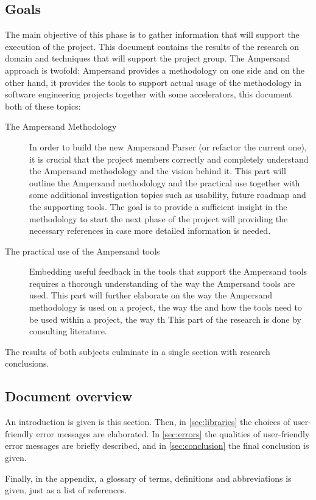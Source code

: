 \subsection{Goals}
The main objective of this phase is to gather information that will support the execution of the project.
This document contains the results of the research on domain and techniques that will support the project group.
The Ampersand approach is twofold: Ampersand provides a methodology on one side and on the other hand, it provides the tools to support actual usage of the methodology in software engineering projects together with some accelerators, this document both of these topics:
\begin{description}
	\item[The Ampersand Methodology]
	In order to build the new Ampersand Parser (or refactor the current one), it is crucial that the project members correctly and completely understand the Ampersand methodology and the vision behind it.
	This part will outline the Ampersand methodology and the practical use together with some additional investigation topics such as usability, future roadmap and the supporting tools.
	The goal is to provide a sufficient insight in the methodology to start the next phase of the project will providing the necessary references in case more detailed information is needed.
	
	\item[The practical use of the Ampersand tools]
	Embedding useful feedback in the tools that support the Ampersand tools requires a thorough understanding of the way the Ampersand tools are used.
	This part will further elaborate on the way the Ampersand methodology is used on a project, the way the  and how the tools need to be used within a project, the way th
	This part of the research is done by consulting literature.
\end{description}
%
The results of both subjects culminate in a single section with research conclusions.

\subsection{Document overview}
An introduction is given is this section.
Then, in \autoref{sec:libraries} the choices of user-friendly error messages are elaborated.
In \autoref{sec:errors} the qualities of user-friendly error messages are briefly described, and in \autoref{sec:conclusion} the final conclusion is given.

Finally, in the appendix, a glossary of terms, definitions and abbreviations is given, just as a list of references.
